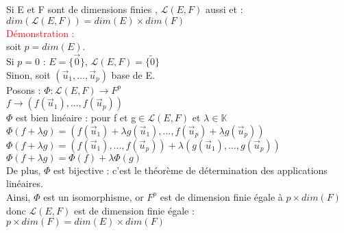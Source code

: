 \documentclass{article}
\begin{document}
Si E et F sont de dimensions finies , $\mathcal L (E,F)$ aussi et : \\
$dim(\mathcal L(E,F))= dim(E) \times dim(F)$ \\
\textcolor{red}{Démonstration :} \\
soit $p=dim(E)$. \\
Si $p=0$ : $E= \lbrace \vec 0 \rbrace$, $\mathcal L (E,F)= \lbrace \tilde{0} \rbrace$ \\
Sinon, soit $(\vec u_1,...,  \vec u_p)$ base de E. \\
Posons : $\Phi : \mathcal L(E,F) \rightarrow F^p$ \\
$f \rightarrow (f(\vec u_1),...,f(\vec u_p))$ \\
$\Phi$ est bien linéaire : pour f et g$\in \mathcal L (E,F)$ et $\lambda \in \mathbb K$ \\
$\Phi (f+ \lambda g)= (f( \vec u_1)+ \lambda g(\vec u_1),...,f(\vec u_p)+ \lambda g(\vec u_p))$ \\
$\Phi (f+ \lambda g)= (f(\vec u_1),...,f(\vec u_p)) + \lambda (g(\vec u_1),...,g(\vec u_p))$ \\
$\Phi (f+ \lambda g)= \Phi (f) + \lambda \Phi(g)$ \\
De plus, $\Phi$ est bijective : c'est le théorème de détermination des applications linéaires. \\
Ainsi, $\Phi$ est un isomorphisme, or $F^p$ est de dimension finie égale à $p \times dim(F)$ donc $\mathcal L (E,F)$ est de dimension finie égale : $p \times dim(F)= dim(E) \times dim(F)$
\end{document}
